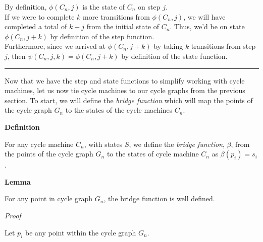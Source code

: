 \documentclass[a4paper,12pt]{article}
\begin{document}
\noindent By definition, $\phi(C_n, j)$ is the state of $C_n$ on step $j$.\\

\noindent If we were to complete $k$ more transitions from $\phi(C_n, j)$, we will have completed a total of $k + j$ from the initial state of $C_n$. Thus, we'd be on state $\phi(C_n, j + k)$ by definition of the step function.\\

\noindent Furthermore, since we arrived at $\phi(C_n, j + k)$ by taking $k$ transitions from step $j$, then $\psi(C_n, j, k) = \phi(C_n, j + k)$ by definition of the state function.

\begin{center}
\noindent\rule{8cm}{0.4pt}
\end{center}





\noindent Now that we have the step and state functions to simplify working with cycle machines, let us now tie cycle machines to our cycle graphs from the previous section. To start, we will define the \textit{bridge function} which will map the points of the cycle graph $G_n$ to the states of the cycle machines $C_n$.\\




\label{definition:bridge_function}
\hypertarget{definition:bridge_function}{}
\begin{tcolorbox}
\textbf{Definition}

\noindent For any cycle machine $C_n$, with states $S$, we define the \textit{bridge function}, $\beta$, from the points of the cycle graph $G_n$ to the states of cycle machine $C_n$ as $\beta(p_i) = s_i$.

\end{tcolorbox}







\label{lemma:bridge_is_well_defined}
\hypertarget{lemma:bridge_is_well_defined}{}
\begin{tcolorbox}
\textbf{Lemma}

\noindent For any point in cycle graph $G_n$, the bridge function is well defined.

\end{tcolorbox}


\noindent
\textsl{Proof}

\noindent Let $p_i$ be any point within the cycle graph $G_n$.\\
\end{document}
